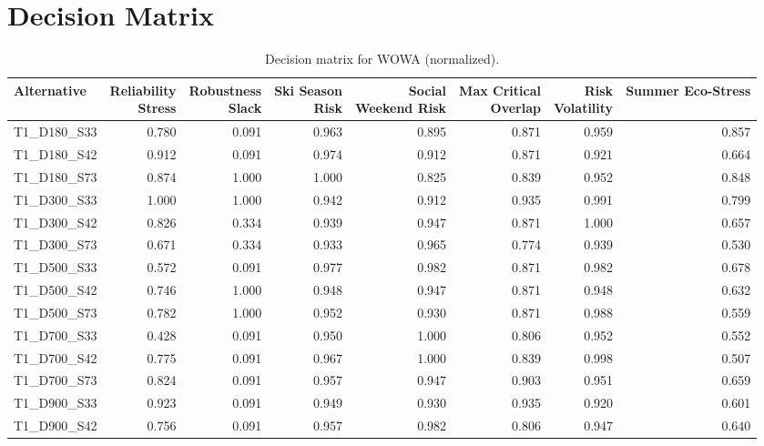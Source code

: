 \section{Decision Matrix}
\label{app:decision_matrix}

\begin{table}[H]
	\centering
	\scriptsize
	\renewcommand{\arraystretch}{0.90}
	\caption{Decision matrix for WOWA (normalized).}
	\label{tab:dm_matrix}
	\begin{adjustbox}{center}
		\begin{tabular}{lrrrrrrr}
			\toprule
Alternative & \shortstack{Reliability\\Stress} & \shortstack{Robustness\\Slack} & \shortstack{Ski Season\\Risk} & \shortstack{Social\\Weekend Risk} & \shortstack{Max Critical\\Overlap} & \shortstack{Risk\\Volatility} & Summer Eco-Stress \\
			\midrule
T1\_D180\_S33 & 0.780 & 0.091 & 0.963 & 0.895 & 0.871 & 0.959 & 0.857 \\
T1\_D180\_S42 & 0.912 & 0.091 & 0.974 & 0.912 & 0.871 & 0.921 & 0.664 \\
T1\_D180\_S73 & 0.874 & 1.000 & 1.000 & 0.825 & 0.839 & 0.952 & 0.848 \\
T1\_D300\_S33 & 1.000 & 1.000 & 0.942 & 0.912 & 0.935 & 0.991 & 0.799 \\
T1\_D300\_S42 & 0.826 & 0.334 & 0.939 & 0.947 & 0.871 & 1.000 & 0.657 \\
T1\_D300\_S73 & 0.671 & 0.334 & 0.933 & 0.965 & 0.774 & 0.939 & 0.530 \\
T1\_D500\_S33 & 0.572 & 0.091 & 0.977 & 0.982 & 0.871 & 0.982 & 0.678 \\
T1\_D500\_S42 & 0.746 & 1.000 & 0.948 & 0.947 & 0.871 & 0.948 & 0.632 \\
T1\_D500\_S73 & 0.782 & 1.000 & 0.952 & 0.930 & 0.871 & 0.988 & 0.559 \\
T1\_D700\_S33 & 0.428 & 0.091 & 0.950 & 1.000 & 0.806 & 0.952 & 0.552 \\
T1\_D700\_S42 & 0.775 & 0.091 & 0.967 & 1.000 & 0.839 & 0.998 & 0.507 \\
T1\_D700\_S73 & 0.824 & 0.091 & 0.957 & 0.947 & 0.903 & 0.951 & 0.659 \\
T1\_D900\_S33 & 0.923 & 0.091 & 0.949 & 0.930 & 0.935 & 0.920 & 0.601 \\
T1\_D900\_S42 & 0.756 & 0.091 & 0.957 & 0.982 & 0.806 & 0.947 & 0.640 \\

\end{tabular}
\end{adjustbox}
\end{table}
